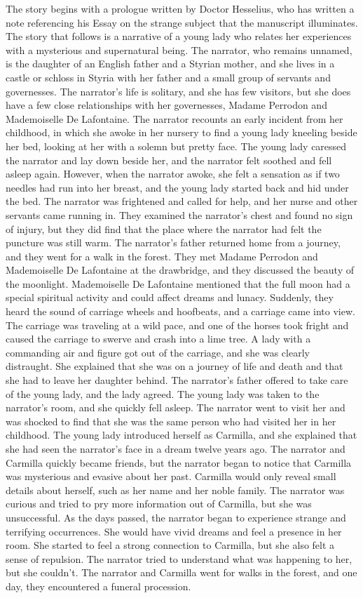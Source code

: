 \documentclass{article} %
\begin{document}
The story begins with a prologue written by Doctor Hesselius, who has written a note referencing his Essay on the strange subject that the manuscript illuminates. The story that follows is a narrative of a young lady who relates her experiences with a mysterious and supernatural being. The narrator, who remains unnamed, is the daughter of an English father and a Styrian mother, and she lives in a castle or schloss in Styria with her father and a small group of servants and governesses. The narrator's life is solitary, and she has few visitors, but she does have a few close relationships with her governesses, Madame Perrodon and Mademoiselle De Lafontaine. The narrator recounts an early incident from her childhood, in which she awoke in her nursery to find a young lady kneeling beside her bed, looking at her with a solemn but pretty face. The young lady caressed the narrator and lay down beside her, and the narrator felt soothed and fell asleep again. However, when the narrator awoke, she felt a sensation as if two needles had run into her breast, and the young lady started back and hid under the bed. The narrator was frightened and called for help, and her nurse and other servants came running in. They examined the narrator's chest and found no sign of injury, but they did find that the place where the narrator had felt the puncture was still warm. The narrator's father returned home from a journey, and they went for a walk in the forest. They met Madame Perrodon and Mademoiselle De Lafontaine at the drawbridge, and they discussed the beauty of the moonlight. Mademoiselle De Lafontaine mentioned that the full moon had a special spiritual activity and could affect dreams and lunacy. Suddenly, they heard the sound of carriage wheels and hoofbeats, and a carriage came into view. The carriage was traveling at a wild pace, and one of the horses took fright and caused the carriage to swerve and crash into a lime tree. A lady with a commanding air and figure got out of the carriage, and she was clearly distraught. She explained that she was on a journey of life and death and that she had to leave her daughter behind. The narrator's father offered to take care of the young lady, and the lady agreed. The young lady was taken to the narrator's room, and she quickly fell asleep. The narrator went to visit her and was shocked to find that she was the same person who had visited her in her childhood. The young lady introduced herself as Carmilla, and she explained that she had seen the narrator's face in a dream twelve years ago. The narrator and Carmilla quickly became friends, but the narrator began to notice that Carmilla was mysterious and evasive about her past. Carmilla would only reveal small details about herself, such as her name and her noble family. The narrator was curious and tried to pry more information out of Carmilla, but she was unsuccessful. As the days passed, the narrator began to experience strange and terrifying occurrences. She would have vivid dreams and feel a presence in her room. She started to feel a strong connection to Carmilla, but she also felt a sense of repulsion. The narrator tried to understand what was happening to her, but she couldn't. The narrator and Carmilla went for walks in the forest, and one day, they encountered a funeral procession. 
\end{document}
